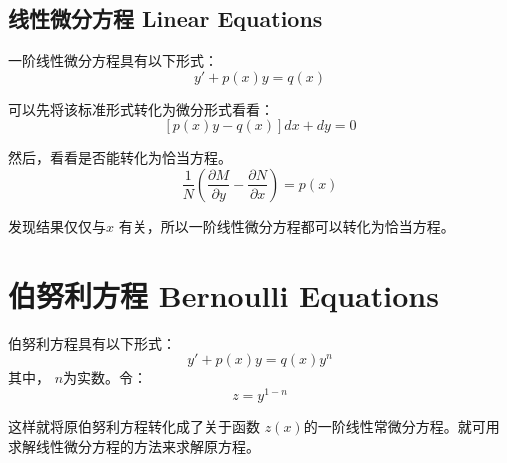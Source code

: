 \documentclass[12pt]{article}
\begin{document}
\subsection{线性微分方程 Linear Equations}
一阶线性微分方程具有以下形式：
$$
y' + p(x)y = q(x)
$$

可以先将该标准形式转化为微分形式看看：
$$
[p(x)y - q(x)]dx + dy = 0
$$

然后，看看是否能转化为恰当方程。
$$
\frac{1}{N}(\frac{\partial M}{\partial y} - \frac{\partial N}{\partial x}) = p(x)
$$

发现结果仅仅与$x$ 有关，所以一阶线性微分方程都可以转化为恰当方程。

\section{伯努利方程 Bernoulli Equations}
伯努利方程具有以下形式：
$$
y' + p(x)y = q(x)y^n
$$
其中， $n$为实数。令：
$$
z = y^{1-n}
$$

这样就将原伯努利方程转化成了关于函数 $z(x)$的一阶线性常微分方程。就可用求解线性微分方程的方法来求解原方程。


\end{document}

